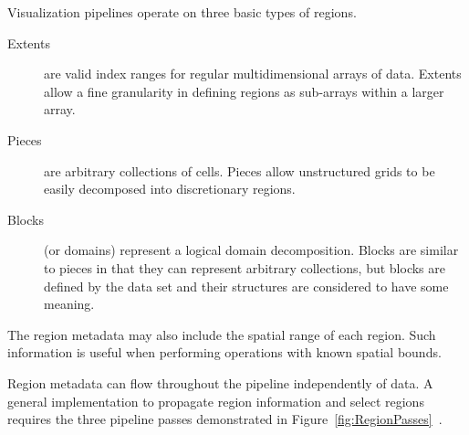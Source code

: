 \documentclass{article}
\newcommand*{\lcite}[1]{~\cite{#1}}
\begin{document}
Visualization pipelines operate on three basic types of regions.
\begin{description}
\item[Extents] are valid index ranges for regular multidimensional arrays
  of data.  Extents allow a fine granularity in defining regions as
  sub-arrays within a larger array.
\item[Pieces] are arbitrary collections of cells.  Pieces allow
  unstructured grids to be easily decomposed into discretionary regions.
\item[Blocks] (or domains) represent a logical domain decomposition.
  Blocks are similar to pieces in that they can represent arbitrary
  collections, but blocks are defined by the data set and their structures
  are considered to have some meaning.
\end{description}
The region metadata may also include the spatial range of each region.
Such information is useful when performing operations with known spatial
bounds.

Region metadata can flow throughout the pipeline independently of data.  A
general implementation to propagate region information and select regions
requires the three pipeline passes demonstrated in
Figure~\ref{fig:RegionPasses}\lcite{Ahrens2001}.
\end{document}
